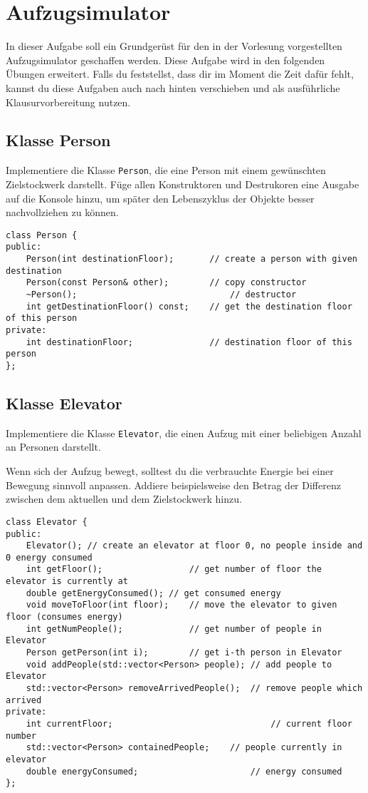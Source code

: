\section{Aufzugsimulator}
In dieser Aufgabe soll ein Grundgerüst für den in der Vorlesung vorgestellten Aufzugsimulator geschaffen werden.
Diese Aufgabe wird in den folgenden Übungen erweitert.
Falls du feststellst, dass dir im Moment die Zeit dafür fehlt, kannst du diese Aufgaben auch nach hinten verschieben und als ausführliche Klausurvorbereitung nutzen.

\subsection{Klasse Person}
Implementiere die Klasse \texttt{Person}, die eine Person mit einem gewünschten Zielstockwerk darstellt.
Füge allen Konstruktoren und Destrukoren eine Ausgabe auf die Konsole hinzu, um später den Lebenszyklus der Objekte besser nachvollziehen zu können.

\begin{lstlisting}
class Person {
public:
	Person(int destinationFloor);		// create a person with given destination
	Person(const Person& other);		// copy constructor
	~Person();								// destructor
	int getDestinationFloor() const;	// get the destination floor of this person
private:
	int destinationFloor;				// destination floor of this person
};
\end{lstlisting}

\subsection{Klasse Elevator}
Implementiere die Klasse \texttt{Elevator}, die einen Aufzug mit einer beliebigen Anzahl an Personen darstellt.

Wenn sich der Aufzug bewegt, solltest du die verbrauchte Energie bei einer Bewegung sinnvoll anpassen.
Addiere beispielsweise den Betrag der Differenz zwischen dem aktuellen und dem Zielstockwerk hinzu.

\begin{lstlisting}
class Elevator {
public:
	Elevator();	// create an elevator at floor 0, no people inside and 0 energy consumed
	int getFloor();					// get number of floor the elevator is currently at
	double getEnergyConsumed();	// get consumed energy
	void moveToFloor(int floor);	// move the elevator to given floor (consumes energy)
	int getNumPeople();				// get number of people in Elevator
	Person getPerson(int i);		// get i-th person in Elevator
	void addPeople(std::vector<Person> people);	// add people to Elevator
	std::vector<Person> removeArrivedPeople();	// remove people which arrived
private:
	int currentFloor;								// current floor number
	std::vector<Person> containedPeople;	// people currently in elevator
	double energyConsumed;						// energy consumed
};
\end{lstlisting}

